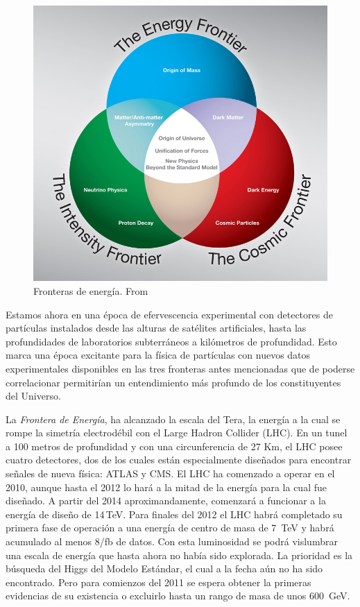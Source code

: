 \begin{figure}
  \centering
\includegraphics[scale=0.3]{three-frontiers-large}
  \caption{Fronteras de energía. From \cite{fermilab}}
  \label{fig:1}
\end{figure}

Estamos ahora en una época de efervescencia experimental con
detectores de partículas instalados desde las alturas de satélites
artificiales, hasta las profundidades de laboratorios subterráneos a
kilómetros de profundidad. Esto marca una época excitante para la
física de partículas con nuevos datos experimentales disponibles en
las tres fronteras antes mencionadas que de poderse correlacionar
permitirían un entendimiento más profundo de los constituyentes del
Universo.  

La \emph{Frontera de Energía}, ha alcanzado la escala del Tera, la energía a
la cual se rompe la simetría electrodébil con el Large Hadron Collider
(LHC). En un tunel a 100 metros de profundidad y con una
circunferencia de 27 Km, el LHC posee cuatro detectores, dos de los cuales
están especialmente diseñados para encontrar señales de nueva física:
ATLAS y CMS. El LHC ha comenzado a operar en el 2010, aunque hasta el
2012 lo hará a la mitad de la energía para la cual fue diseñado. A
partir del 2014 aproximandamente, comenzará a funcionar a la energía
de diseño de 14\,TeV. Para finales del 2012 el LHC habrá completado su
primera fase de operación a una energía de centro de masa de 7~TeV y
habrá acumulado al menos 8/fb de datos. Con esta luminosidad se podrá
vislumbrar una escala de energía que hasta ahora no había sido
explorada. La prioridad es la búsqueda del Higgs del Modelo Estándar,
el cual a la fecha aún no ha sido encontrado. Pero para comienzos del
2011 se espera obtener la primeras evidencias de su existencia o
excluirlo hasta un rango de masa de unos 600~GeV.

